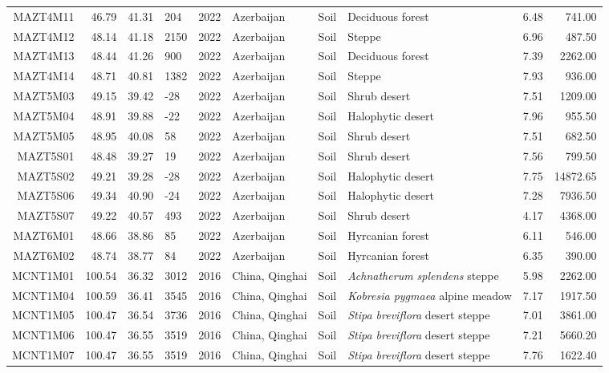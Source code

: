 \begin{table}[ht]
\begin{tabular}{rrrlrlllrr}
  MAZT4M11 & 46.79 & 41.31 & 204 & 2022 & Azerbaijan & Soil & Deciduous forest & 6.48 & 741.00 \\ 
  MAZT4M12 & 48.14 & 41.18 & 2150 & 2022 & Azerbaijan & Soil & Steppe & 6.96 & 487.50 \\ 
  MAZT4M13 & 48.44 & 41.26 & 900 & 2022 & Azerbaijan & Soil & Deciduous forest & 7.39 & 2262.00 \\ 
  MAZT4M14 & 48.71 & 40.81 & 1382 & 2022 & Azerbaijan & Soil & Steppe & 7.93 & 936.00 \\ 
  MAZT5M03 & 49.15 & 39.42 & -28 & 2022 & Azerbaijan & Soil & Shrub desert & 7.51 & 1209.00 \\ 
  MAZT5M04 & 48.91 & 39.88 & -22 & 2022 & Azerbaijan & Soil & Halophytic desert & 7.96 & 955.50 \\ 
  MAZT5M05 & 48.95 & 40.08 & 58 & 2022 & Azerbaijan & Soil & Shrub desert & 7.51 & 682.50 \\ 
  MAZT5S01 & 48.48 & 39.27 & 19 & 2022 & Azerbaijan & Soil & Shrub desert & 7.56 & 799.50 \\ 
  MAZT5S02 & 49.21 & 39.28 & -28 & 2022 & Azerbaijan & Soil & Halophytic desert & 7.75 & 14872.65 \\ 
  MAZT5S06 & 49.34 & 40.90 & -24 & 2022 & Azerbaijan & Soil & Halophytic desert & 7.28 & 7936.50 \\ 
  MAZT5S07 & 49.22 & 40.57 & 493 & 2022 & Azerbaijan & Soil & Shrub desert & 4.17 & 4368.00 \\ 
  MAZT6M01 & 48.66 & 38.86 & 85 & 2022 & Azerbaijan & Soil & Hyrcanian forest & 6.11 & 546.00 \\ 
  MAZT6M02 & 48.74 & 38.77 & 84 & 2022 & Azerbaijan & Soil & Hyrcanian forest & 6.35 & 390.00 \\ 
  MCNT1M01 & 100.54 & 36.32 & 3012 & 2016 & China, Qinghai & Soil & \textit{Achnatherum splendens} steppe & 5.98 & 2262.00 \\ 
  MCNT1M04 & 100.59 & 36.41 & 3545 & 2016 & China, Qinghai & Soil & \textit{Kobresia pygmaea} alpine meadow  & 7.17 & 1917.50 \\ 
  MCNT1M05 & 100.47 & 36.54 & 3736 & 2016 & China, Qinghai & Soil & \textit{Stipa breviflora} desert steppe & 7.01 & 3861.00 \\ 
  MCNT1M06 & 100.47 & 36.55 & 3519 & 2016 & China, Qinghai & Soil & \textit{Stipa breviflora} desert steppe & 7.21 & 5660.20 \\ 
  MCNT1M07 & 100.47 & 36.55 & 3519 & 2016 & China, Qinghai & Soil & \textit{Stipa breviflora} desert steppe & 7.76 & 1622.40 \\ 

\end{tabular}
\end{table}
